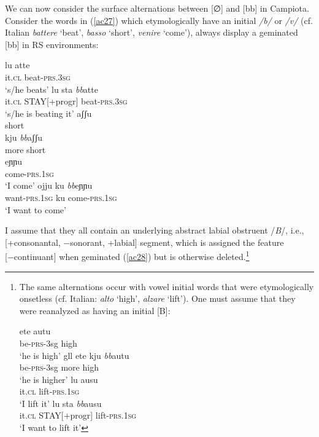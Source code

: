 \documentclass[output=paper]{langscibook}
\begin{document}
We can now consider the surface alternations between [∅] and [bb] in Campiota.  Consider the words in (\ref{ac27}) which etymologically have an initial \textit{/b/} or \textit{/v/} (cf. Italian \textit{battere} ‘beat’, \textit{basso} ‘short’, \textit{venire} ‘come’), always display a geminated [bb] in RS environments:

\ea\label{ac27}
    \ea\label{ac27a}
        \ea \label{ac27ai}\gll lu atte\\
            it.\textsc{cl} beat-\textsc{prs}.\textsc{3sg}\\
            \glt `s/he beats'
        \ex \label{ac27aii}\gll lu   sta     \textit{bb}atte\\
            it.\textsc{cl} STAY[+progr] beat-\textsc{prs}.\textsc{3sg}\\
            \glt `s/he is beating it'
        \z
    \ex\label{ac27b}
        \ea \label{ac27bi}\gll aʃʃu\\
                short\\
        \ex \label{ac27bii}\gll kju     \textit{bb}aʃʃu\\
                more    short\\
        \z
    \ex\label{ac27c}
        \ea \label{ac27ci}\gll eɲɲu\\
            come-\textsc{prs}.\textsc{1sg}\\
            \glt `I come'
        \ex \label{ac27cii}\gll ojju      ku   \textit{bb}eɲɲu\\
            want-\textsc{prs}.\textsc{1sg} ku   come-\textsc{prs}.\textsc{1sg}\\
            \glt `I want to come'
        \z
    \z
\z

I assume that they all contain an underlying abstract labial obstruent /\textit{B}/, i.e., [+consonantal, −sonorant, +labial] segment, which is assigned the feature [−continuant] when geminated (\ref{ac28}) but is otherwise deleted.\footnote{The same alternations occur with vowel initial words that were etymologically onsetless (cf. Italian: \textit{alto} `high', \textit{alzare} `lift').  One must assume that they were reanalyzed as having an initial [B]:

\ea \label{fn14ex}
    \ea \label{fn14exa}
        \ea \label{fn14exai}\gll ete autu\\
            be-\textsc{prs}-3sg high\\
            \glt ‘he is high’
        \ex \label{fn14exaii}gll ete kju \textit{bb}autu\\
            be-\textsc{prs}-3sg more high\\
            \glt ‘he is higher’
        \z
    \ex \label{fn14exb}
        \ea \label{fn14exbi}\gll lu ausu\\
            it.\textsc{cl} lift-\textsc{prs}.\textsc{1sg}\\
            \glt ‘I lift it’
        \ex \label{fn14exbii}\gll lu sta \textit{bb}ausu\\
            it.\textsc{cl} STAY[+progr]  lift-\textsc{prs}.\textsc{1sg}\\
            \glt ‘I want to lift it’
        \z
    \z
\z

}
\end{document}
